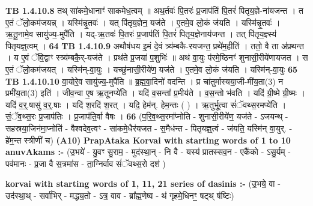 \documentclass[17pt]{extarticle}
\begin{document}
                  \newline
                                \textbf{ TB 1.4.10.8} \newline
                  तथ् सा॑कमे॒धानाꣳ॑ साकमेध॒त्वम् ॥ अथ॒र्तवः॑ पि॒तरः॑ प्र॒जाप॑तिं पि॒तरं॑ पितृय॒ज्ञे-ना॑यजन्त । त ए॒तं ॅलो॒कम॑जयन्न् । यस्मि॑न्नृ॒तवः॑ । यत् पि॑तृय॒ज्ञेन॒ यज॑ते । ए॒तमे॒व लो॒कं ज॑यति । यस्मि॑न्नृ॒तवः॑ । ऋ॒तू॒नामे॒व सायु॑ज्य॒-मुपै॑ति । यद्-ऋ॒तवः॑ पि॒तरः॑ प्र॒जाप॑तिं पि॒तरं॑ पितृय॒ज्ञेनाय॑जन्त । तत् पि॑तृय॒ज्ञ्स्य॑ पितृयज्ञ्॒त्वम् । \textbf{ 64} \newline
                  \newline
                                \textbf{ TB 1.4.10.9} \newline
                  अथौष॑धय इ॒मं दे॒वं त्र्य॑म्बकै-रयजन्त॒ प्रथे॑म॒हीति॑ । ततो॒ वै ता अ॑प्रथन्त । य ए॒वं ॅवि॒द्वाꣳ स्त्र्य॑म्बकै॒र्-यज॑ते । प्रथ॑ते प्र॒जया॑ प॒शुभिः॑ ॥ अथ॑ वा॒युः प॑रमे॒ष्ठिनꣳ॑ शुनासी॒रीये॑णायजत । स ए॒तं ॅलो॒कम॑जयत् । यस्मि॑न्-वा॒युः । यच्छु॑नासी॒रीये॑ण॒ यज॑ते । ए॒तमे॒व लो॒कं ज॑यति । यस्मि॑न्-वा॒युः \textbf{ 65} \newline
                  \newline
                                \textbf{ TB 1.4.10.10} \newline
                  वा॒योरे॒व सायु॑ज्य॒-मुपै॑ति ॥ ब्र॒ह्म॒वा॒दिनो॑ वदन्ति । प्र चा॑तुर्मास्यया॒जी-मी॑य॒ता(3) न प्रमी॑य॒ता(3) इति॑ । जीव॒न्वा ए॒ष ऋ॒तूनप्ये॑ति । यदि॑ व॒सन्ता᳚ प्र॒मीय॑ते । व॒स॒न्तो भ॑वति । यदि॑ ग्री॒ष्मे ग्री॒ष्मः । यदि॑ व॒र्॒.षासु॑ व॒र्॒.षाः । यदि॑ श॒रदि॑ श॒रत् । यदि॒ हेम॑न्. हेम॒न्तः ( ) । ऋ॒तुर्भू॒त्वा सं॑ॅवथ्स॒रमप्ये॑ति । सं॒ॅव॒थ्स॒रः प्र॒जाप॑तिः । प्र॒जाप॑ति॒र्वा वैषः । \textbf{ 66} \newline
                  \newline
                                    (प॒रि॒व॒थ्स॒रमा᳚प्नोति - शुनासी॒रीये॑ण॒ यज॑ते - ऽजयन्थ् - सहस्रया॒जिन॑मा॒प्नोति॑ - वैश्वदेव॒त्वꣳ - सा॑कमे॒धैर॑यजत - स॒मैध॑न्त - पितृयज्ञ्॒त्वं - ज॑यति॒ यस्मि॑न् वा॒युर्. - हे॑म॒न्त स्त्रीणी॑ च) \textbf{(A10)} \newline \newline
                \textbf{PrapAtaka Korvai with starting  words of 1 to 10 anuvAkams :-} \newline
        (उ॒भये॑ - यु॒वꣳ सु॒राम॒ - मुद॑स्था॒न् - नि वै - यस्य॑ प्रातस्सव॒न - एकै॑को - ऽसु॒र्यम् - पव॑मानः - प्र॒जा वै स॒त्रमा॑स - ता॒ग्निर्वाव सं॑ॅवथ्स॒रो दश॑ ) \newline

        \textbf{korvai with starting words of 1, 11, 21 series of dasinis :-} \newline
        (उ॒भये॒ वा - उद॑स्था॒थ् - सर्वा॑भिर् - मद्ध्य॒तो - ऽत्र॒ वाव - ब्रा᳚ह्म॒णेष्व - थ॑ गृहमे॒धिनꣳ॒॒ षट्थ् ष॑ष्टिः) \newline
\end{document}

